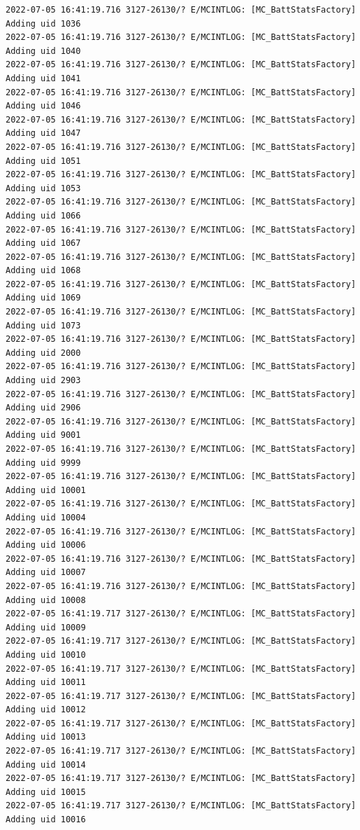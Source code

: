 \documentclass[a4paper,12pt]{book}
\begin{document}
\begin{lstlisting}
2022-07-05 16:41:19.716 3127-26130/? E/MCINTLOG: [MC_BattStatsFactory] Adding uid 1036
2022-07-05 16:41:19.716 3127-26130/? E/MCINTLOG: [MC_BattStatsFactory] Adding uid 1040
2022-07-05 16:41:19.716 3127-26130/? E/MCINTLOG: [MC_BattStatsFactory] Adding uid 1041
2022-07-05 16:41:19.716 3127-26130/? E/MCINTLOG: [MC_BattStatsFactory] Adding uid 1046
2022-07-05 16:41:19.716 3127-26130/? E/MCINTLOG: [MC_BattStatsFactory] Adding uid 1047
2022-07-05 16:41:19.716 3127-26130/? E/MCINTLOG: [MC_BattStatsFactory] Adding uid 1051
2022-07-05 16:41:19.716 3127-26130/? E/MCINTLOG: [MC_BattStatsFactory] Adding uid 1053
2022-07-05 16:41:19.716 3127-26130/? E/MCINTLOG: [MC_BattStatsFactory] Adding uid 1066
2022-07-05 16:41:19.716 3127-26130/? E/MCINTLOG: [MC_BattStatsFactory] Adding uid 1067
2022-07-05 16:41:19.716 3127-26130/? E/MCINTLOG: [MC_BattStatsFactory] Adding uid 1068
2022-07-05 16:41:19.716 3127-26130/? E/MCINTLOG: [MC_BattStatsFactory] Adding uid 1069
2022-07-05 16:41:19.716 3127-26130/? E/MCINTLOG: [MC_BattStatsFactory] Adding uid 1073
2022-07-05 16:41:19.716 3127-26130/? E/MCINTLOG: [MC_BattStatsFactory] Adding uid 2000
2022-07-05 16:41:19.716 3127-26130/? E/MCINTLOG: [MC_BattStatsFactory] Adding uid 2903
2022-07-05 16:41:19.716 3127-26130/? E/MCINTLOG: [MC_BattStatsFactory] Adding uid 2906
2022-07-05 16:41:19.716 3127-26130/? E/MCINTLOG: [MC_BattStatsFactory] Adding uid 9001
2022-07-05 16:41:19.716 3127-26130/? E/MCINTLOG: [MC_BattStatsFactory] Adding uid 9999
2022-07-05 16:41:19.716 3127-26130/? E/MCINTLOG: [MC_BattStatsFactory] Adding uid 10001
2022-07-05 16:41:19.716 3127-26130/? E/MCINTLOG: [MC_BattStatsFactory] Adding uid 10004
2022-07-05 16:41:19.716 3127-26130/? E/MCINTLOG: [MC_BattStatsFactory] Adding uid 10006
2022-07-05 16:41:19.716 3127-26130/? E/MCINTLOG: [MC_BattStatsFactory] Adding uid 10007
2022-07-05 16:41:19.716 3127-26130/? E/MCINTLOG: [MC_BattStatsFactory] Adding uid 10008
2022-07-05 16:41:19.717 3127-26130/? E/MCINTLOG: [MC_BattStatsFactory] Adding uid 10009
2022-07-05 16:41:19.717 3127-26130/? E/MCINTLOG: [MC_BattStatsFactory] Adding uid 10010
2022-07-05 16:41:19.717 3127-26130/? E/MCINTLOG: [MC_BattStatsFactory] Adding uid 10011
2022-07-05 16:41:19.717 3127-26130/? E/MCINTLOG: [MC_BattStatsFactory] Adding uid 10012
2022-07-05 16:41:19.717 3127-26130/? E/MCINTLOG: [MC_BattStatsFactory] Adding uid 10013
2022-07-05 16:41:19.717 3127-26130/? E/MCINTLOG: [MC_BattStatsFactory] Adding uid 10014
2022-07-05 16:41:19.717 3127-26130/? E/MCINTLOG: [MC_BattStatsFactory] Adding uid 10015
2022-07-05 16:41:19.717 3127-26130/? E/MCINTLOG: [MC_BattStatsFactory] Adding uid 10016

\end{lstlisting}
\end{document}
